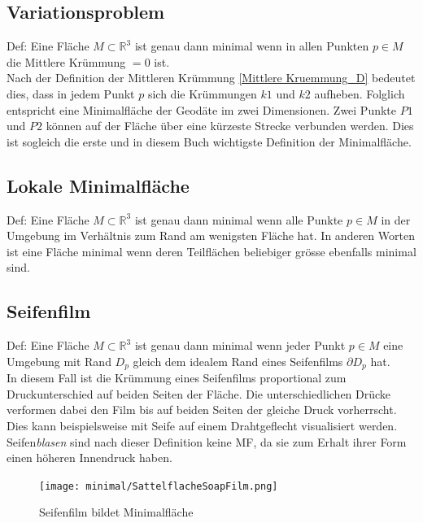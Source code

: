 \begin{refsection}
\subsection{Variationsproblem}\label{Variationsproblem}
Def: Eine Fläche $ \textit{M} \subset \mathbb{R}^{3} $ ist genau dann minimal wenn in allen Punkten $p \in M$ die Mittlere Krümmung $=0$ ist.\\
Nach der Definition der Mittleren Krümmung \eqref{Mittlere Kruemmung_D} bedeutet dies, dass in jedem Punkt $p$ sich die Krümmungen $k1$ und $k2$ aufheben.
Folglich entspricht eine Minimalfläche der Geodäte im zwei Dimensionen. Zwei Punkte $P1$ und $P2$ können auf der Fläche über eine kürzeste Strecke verbunden werden.  Dies ist sogleich die erste und in diesem Buch wichtigste Definition der Minimalfläche.

\subsection{Lokale Minimalfläche}\label{Lokale Minimalflaeche}

Def: Eine Fläche $M\subset\mathbb{R}^{3}$ ist genau dann minimal wenn alle Punkte $ p \in M $ in der Umgebung  im Verhältnis zum Rand am wenigsten Fläche hat.
In anderen Worten ist eine Fläche minimal wenn deren Teilflächen beliebiger grösse ebenfalls minimal sind.  

\subsection{Seifenfilm}\label{Seifenfilm}
Def: Eine Fläche $M\subset\mathbb{R}^{3}$ ist genau dann minimal wenn jeder Punkt $p \in M$ eine Umgebung mit Rand $D_p$ gleich dem idealem Rand eines Seifenfilms $\partial D_p$ hat.\\
In diesem Fall ist die Krümmung eines Seifenfilms proportional zum Druckunterschied auf beiden Seiten der Fläche. Die unterschiedlichen Drücke verformen dabei den Film bis auf beiden Seiten der gleiche Druck vorherrscht. Dies kann beispielsweise mit Seife auf einem Drahtgeflecht visualisiert werden. Seifen\textit{blasen} sind nach dieser Definition keine MF, da sie zum Erhalt ihrer Form einen höheren Innendruck haben.

\begin{figure}[H]
  \centering
  \texttt{[image: minimal/SattelflacheSoapFilm.png]}
  \caption{Seifenfilm bildet Minimalfläche} 
\end{figure}


\end{refsection}
